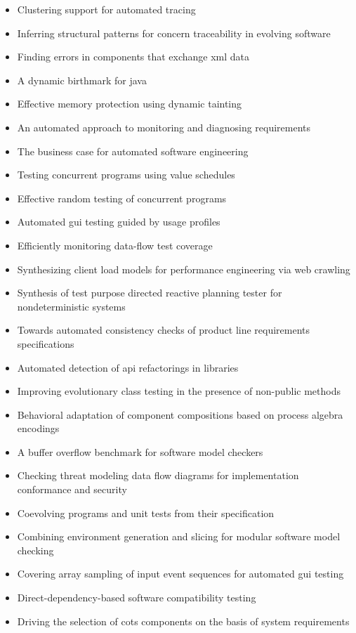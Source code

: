 {\begin{itemize}[itemsep=-1ex]
  \item Clustering support for automated tracing
  \item Inferring structural patterns for concern traceability in evolving software
  \item Finding errors in components that exchange xml data
  \item A dynamic birthmark for java
  \item Effective memory protection using dynamic tainting
  \item An automated approach to monitoring and diagnosing requirements
  \item The business case for automated software engineering
  \item Testing concurrent programs using value schedules
  \item Effective random testing of concurrent programs
  \item Automated gui testing guided by usage profiles
  \item Efficiently monitoring data-flow test coverage
  \item Synthesizing client load models for performance engineering via web crawling
  \item Synthesis of test purpose directed reactive planning tester for nondeterministic systems
  \item Towards automated consistency checks of product line requirements specifications
  \item Automated detection of api refactorings in libraries
  \item Improving evolutionary class testing in the presence of non-public methods
  \item Behavioral adaptation of component compositions based on process algebra encodings
  \item A buffer overflow benchmark for software model checkers
  \item Checking threat modeling data flow diagrams for implementation conformance and security
  \item Coevolving programs and unit tests from their specification
  \item Combining environment generation and slicing for modular software model checking
  \item Covering array sampling of input event sequences for automated gui testing
  \item Direct-dependency-based software compatibility testing
  \item Driving the selection of cots components on the basis of system requirements

\end{itemize}}
